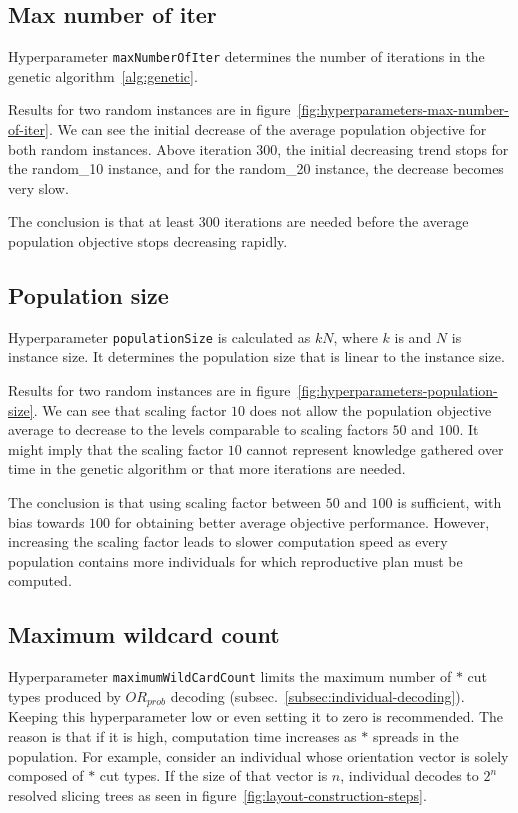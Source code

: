 \subsection{Max number of iter}\label{subsec:max-number-of-iter}
Hyperparameter \verb|maxNumberOfIter| determines the number of iterations in the genetic algorithm~\ref{alg:genetic}.

Results for two random instances are in figure~\ref{fig:hyperparameters-max-number-of-iter}.
We can see the initial decrease of the average population objective for both random instances.
Above iteration 300, the initial decreasing trend stops for the random\_10 instance, and for the random\_20 instance, the decrease becomes very slow.

The conclusion is that at least 300 iterations are needed before the average population objective
stops decreasing rapidly.

\subsection{Population size}\label{subsec:population-size}

Hyperparameter \verb|populationSize| is calculated as $kN$, where $k$ is 
and $N$ is instance size.
It determines the population size that is linear to the instance size.

Results for two random instances are in figure~\ref{fig:hyperparameters-population-size}.
We can see that scaling factor $10$ does not allow
the population objective average to decrease to the levels comparable to scaling factors $50$ and $100$.
It might imply that the scaling factor $10$ cannot represent knowledge gathered over time
in the genetic algorithm or that more iterations are needed.

The conclusion is that using scaling factor between $50$ and $100$ is sufficient, with bias towards $100$
for obtaining better average objective performance.
However, increasing the scaling factor leads to slower computation speed as every population contains
more individuals for which reproductive plan must be computed.

\subsection{Maximum wildcard count}\label{subsec:maximum-wild-card-count}
Hyperparameter \verb|maximumWildCardCount| limits the maximum number of $*$ cut types produced by $OR_{prob}$ decoding (subsec.~\ref{subsec:individual-decoding}).
Keeping this hyperparameter low or even setting it to zero is recommended.
The reason is that if it is high, computation time increases as $*$ spreads in the population.
For example, consider an individual whose orientation vector is solely composed of $*$ cut types.
If the size of that vector is $n$, individual decodes to $2^n$ resolved slicing trees as seen in figure~\ref{fig:layout-construction-steps}.

